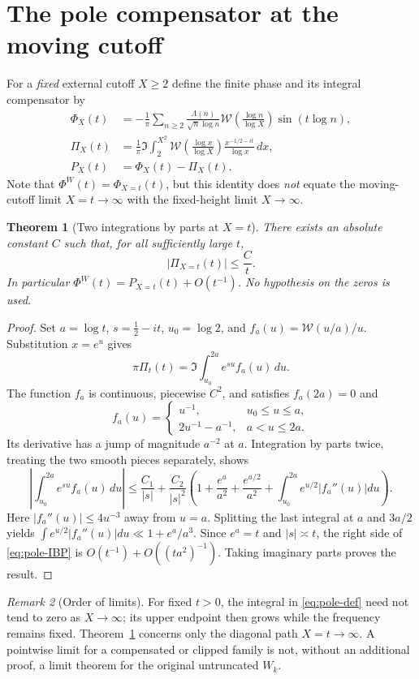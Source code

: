 \documentclass[11pt,leqno]{amsart}
\numberwithin{equation}{section}
\newtheorem{theorem}{Theorem}[section]
\theoremstyle{definition}
\theoremstyle{remark}
\newtheorem{remark}[theorem]{Remark}
\newcommand{\1}{\mathbf 1}
\newcommand{\tW}{\mathscr W}
\begin{document}
\section{The pole compensator at the moving cutoff}\label{sec:pole}
For a \emph{fixed} external cutoff $X\ge2$ define the finite phase and its integral compensator by
\begin{align}
 \Phi_X(t)&=-\frac1\pi\sum_{n\ge2}
 \frac{\Lambda(n)}{\sqrt n\log n}
 \tW\left(\frac{\log n}{\log X}\right)\sin(t\log n),\label{eq:fixed-X}\\
 \Pi_X(t)&=\frac1\pi\Im\int_2^{X^2}
 \tW\left(\frac{\log x}{\log X}\right)
 \frac{x^{-1/2-it}}{\log x}\,dx,\label{eq:pole-def}\\
 P_X(t)&=\Phi_X(t)-\Pi_X(t).\label{eq:compensated}
\end{align}
Note that $\Phi^W(t)=\Phi_{X=t}(t)$, but this identity does \emph{not} equate the moving-cutoff limit $X=t\to\infty$ with the fixed-height limit $X\to\infty$.
\begin{theorem}[Two integrations by parts at $X=t$]\label{thm:pole-t}
There exists an absolute constant $C$ such that, for all sufficiently large $t$,
\begin{equation}\label{eq:pole-Ot}
 \boxed{|\Pi_{X=t}(t)|\le\frac Ct.}
\end{equation}
In particular $\Phi^W(t)=P_{X=t}(t)+O(t^{-1})$. No hypothesis on the zeros is used.
\end{theorem}
\begin{proof}
Set $a=\log t$, $s=\frac12-it$, $u_0=\log2$, and $f_a(u)=\tW(u/a)/u$. Substitution $x=e^u$ gives
\begin{equation}\label{eq:pole-u}
 \pi\Pi_t(t)=\Im\int_{u_0}^{2a}e^{su}f_a(u)\,du.
\end{equation}
The function $f_a$ is continuous, piecewise $C^2$, and satisfies $f_a(2a)=0$ and
\[
 f_a(u)=\begin{cases}u^{-1},&u_0\le u\le a,\\2u^{-1}-a^{-1},&a<u\le2a.\end{cases}
\]
Its derivative has a jump of magnitude $a^{-2}$ at $a$. Integration by parts twice, treating the two smooth pieces separately, shows
\begin{equation}\label{eq:pole-IBP}
 \left|\int_{u_0}^{2a}e^{su}f_a(u)\,du\right|
 \le \frac{C_1}{|s|}
 +\frac{C_2}{|s|^2}\left(1+\frac{e^a}{a^2}+\frac{e^{a/2}}{a^2}
 +\int_{u_0}^{2a}e^{u/2}|f_a''(u)|du\right).
\end{equation}
Here $|f_a''(u)|\le4u^{-3}$ away from $u=a$. Splitting the last integral at $a$ and $3a/2$ yields $\int e^{u/2}|f_a''(u)|du\ll 1+e^a/a^3$. Since $e^a=t$ and $|s|\asymp t$, the right side of \eqref{eq:pole-IBP} is $O(t^{-1})+O((ta^2)^{-1})$. Taking imaginary parts proves the result.
\end{proof}
\begin{remark}[Order of limits]\label{rem:limits}
For fixed $t>0$, the integral in \eqref{eq:pole-def} need not tend to zero as $X\to\infty$; its upper endpoint then grows while the frequency remains fixed. Theorem~\ref{thm:pole-t} concerns only the diagonal path $X=t\to\infty$. A pointwise limit for a compensated or clipped family is not, without an additional proof, a limit theorem for the original untruncated $W_k$.
\end{remark}
\end{document}
